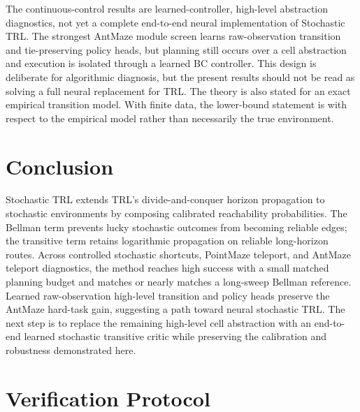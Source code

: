 \documentclass[10pt]{article}
\begin{document}
The continuous-control results are learned-controller, high-level abstraction
diagnostics, not yet a complete end-to-end neural implementation of Stochastic
TRL. The strongest AntMaze module screen learns raw-observation transition and
tie-preserving policy heads, but planning still occurs over a cell abstraction
and execution is isolated through a learned BC controller. This design is
deliberate for algorithmic diagnosis, but the present results should not be
read as solving a full neural replacement for TRL. The theory is also stated
for an exact empirical transition model. With finite data, the lower-bound
statement is with respect to the empirical model rather than necessarily the
true environment.

\section{Conclusion}

Stochastic TRL extends TRL's divide-and-conquer horizon propagation to
stochastic environments by composing calibrated reachability probabilities.
The Bellman term prevents lucky stochastic outcomes from becoming reliable
edges; the transitive term retains logarithmic propagation on reliable
long-horizon routes. Across controlled stochastic shortcuts, PointMaze
teleport, and AntMaze teleport diagnostics, the method reaches high success
with a small matched planning budget and matches or nearly matches a
long-sweep Bellman reference. Learned raw-observation high-level transition
and policy heads preserve the AntMaze hard-task gain, suggesting a path toward
neural stochastic TRL. The next step is to replace the remaining high-level
cell abstraction with an end-to-end learned stochastic transitive critic while
preserving the calibration and robustness demonstrated here.

\appendix

\section{Verification Protocol}
\end{document}
